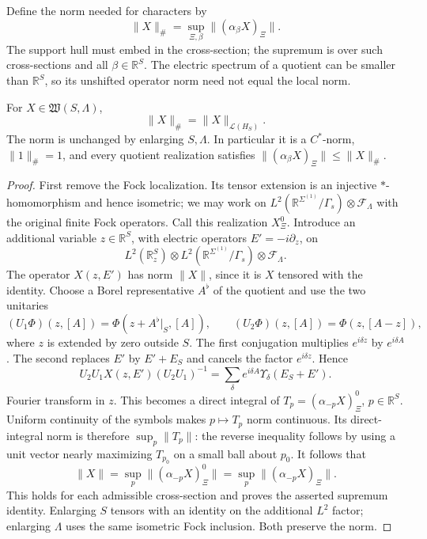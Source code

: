 \documentclass[11pt,letterpaper,reqno]{amsart}
\newcommand{\R}{\mathbb R}
\begin{document}
Define the norm needed for characters by
\begin{equation}\label{eq:diag-sharp-norm}
 \|X\|_\#=\sup_{\Xi,\beta}\| (\alpha_\beta X)_\Xi\|.
\end{equation}
The support hull must embed in the cross-section; the supremum is
over such cross-sections and all $\beta\in\R^S$. The electric spectrum
of a quotient can be smaller than $\R^S$, so its unshifted operator
norm need not equal the local norm.

\begin{proposition}\label{prop:diag-local-norm}
For $X\in\mathfrak W(S,\Lambda)$,
\[
 \|X\|_\#=\|X\|_{\mathcal L(H_S)}.
\]
The norm is unchanged by enlarging $S,\Lambda$. In particular it is
a $C^*$-norm, $\|1\|_\#=1$, and every quotient realization satisfies
$\|(\alpha_\beta X)_\Xi\|\le\|X\|_\#$.
\end{proposition}

\begin{proof}
First remove the Fock localization. Its tensor extension is an
injective $*$-homomorphism and hence isometric; we may work on
$L^2(\R^{\Sigma^{(1)}}/\Gamma_s)\otimes\mathcal F_\Lambda$ with the
original finite Fock operators. Call this realization $X_\Xi^0$.
Introduce an additional variable $z\in\R^S$, with electric operators
$E'=-i\partial_z$, on
\[
 L^2(\R^S_z)\otimes
 L^2(\R^{\Sigma^{(1)}}/\Gamma_s)\otimes\mathcal F_\Lambda.
\]
The operator $X(z,E')$ has norm $\|X\|$, since it is $X$ tensored
with the identity. Choose a Borel representative $A^\flat$ of the
quotient and use the two unitaries
\[
 (U_1\Phi)(z,[A])=\Phi(z+A^\flat|_S,[A]),\qquad
 (U_2\Phi)(z,[A])=\Phi(z,[A-z]),
\]
where $z$ is extended by zero outside $S$. The first conjugation
multiplies $e^{i\delta z}$ by $e^{i\delta A}$. The second replaces
$E'$ by $E'+E_S$ and cancels the factor $e^{i\delta z}$. Hence
\[
 U_2U_1X(z,E')(U_2U_1)^{-1}
       =\sum_\delta e^{i\delta A}\Upsilon_\delta(E_S+E').
\]
Fourier transform in $z$. This becomes a direct integral of
$T_p=(\alpha_{-p}X)_\Xi^0$, $p\in\R^S$. Uniform continuity of the
symbols makes $p\mapsto T_p$ norm continuous. Its direct-integral
norm is therefore $\sup_p\|T_p\|$: the reverse inequality follows
by using a unit vector nearly maximizing $T_{p_0}$ on a small ball
about $p_0$. It follows that
\[
 \|X\|=\sup_p\| (\alpha_{-p}X)_\Xi^0\|
        =\sup_p\| (\alpha_{-p}X)_\Xi\|.
\]
This holds for each admissible cross-section and proves the asserted
supremum identity. Enlarging $S$ tensors with an identity on the
additional $L^2$ factor; enlarging $\Lambda$ uses the same isometric
Fock inclusion. Both preserve the norm.
\end{proof}
\end{document}
